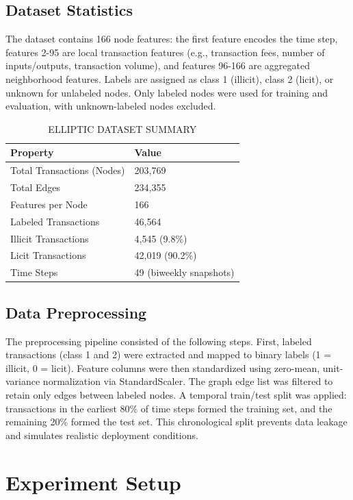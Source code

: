 \documentclass[conference]{IEEEtran}
\begin{document}
\subsection{Dataset Statistics}
The dataset contains 166 node features: the first feature encodes the time step, features 2-95 are local transaction features (e.g., transaction fees, number of inputs/outputs, transaction volume), and features 96-166 are aggregated neighborhood features. Labels are assigned as class 1 (illicit), class 2 (licit), or unknown for unlabeled nodes. Only labeled nodes were used for training and evaluation, with unknown-labeled nodes excluded.

\begin{table}[htbp]
\caption{ELLIPTIC DATASET SUMMARY}
\centering
\begin{tabular}{|l|l|}
\hline
\textbf{Property} & \textbf{Value} \\
\hline
Total Transactions (Nodes) & 203,769 \\
Total Edges & 234,355 \\
Features per Node & 166 \\
Labeled Transactions & 46,564 \\
Illicit Transactions & 4,545 (9.8\%) \\
Licit Transactions & 42,019 (90.2\%) \\
Time Steps & 49 (biweekly snapshots) \\
\hline
\end{tabular}
\label{tab:dataset}
\end{table}

\subsection{Data Preprocessing}
The preprocessing pipeline consisted of the following steps. First, labeled transactions (class 1 and 2) were extracted and mapped to binary labels (1 = illicit, 0 = licit). Feature columns were then standardized using zero-mean, unit-variance normalization via StandardScaler. The graph edge list was filtered to retain only edges between labeled nodes. A temporal train/test split was applied: transactions in the earliest 80\% of time steps formed the training set, and the remaining 20\% formed the test set. This chronological split prevents data leakage and simulates realistic deployment conditions.

\section{Experiment Setup}
\end{document}
